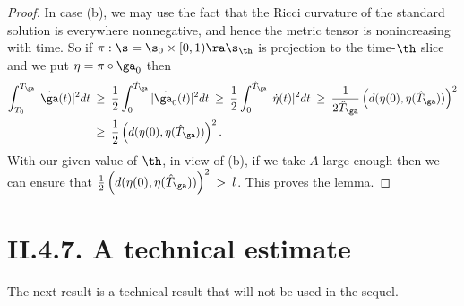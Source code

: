 \begin{proof}
In case (b), we may use the fact that the Ricci curvature
of the standard solution is everywhere
nonnegative,
and hence the metric tensor is nonincreasing with time.  So if
$\pi:\s=\s_0\times [0,1)\ra\s_\th$ is projection
to the time-$\th$ slice and we put $\eta= \pi\circ\ga_0$
then
\begin{align}
\int_{T_0}^{T_\ga}|\dot{\ga}(t)|^2dt \:
& \geq \: \frac12 \int_0^{\hat T_\ga}|\dot{\ga_0}(t)|^2dt \:
\geq \: \frac12 \int_0^{\hat T_\ga}|\dot{\eta}(t)|^2dt
\: \geq \:
\frac{1}{2 \hat T_\ga} \left(d(\eta(0),\eta(\hat T_\ga))\right)^2 \\
& \ge \:
\frac{1}{2} \left(d(\eta(0),\eta(\hat T_\ga))\right)^2. \notag
\end{align}
With our given value of $\th$, in view of (b), if we take $A$ large enough
then we can ensure that $\frac12 \left(d(\eta(0),\eta(\hat T_\ga))\right)^2
\: > \: l$.  This proves the lemma.
\end{proof}


\section{II.4.7. A technical estimate}

The next result is a technical result that will not be used in the sequel.

